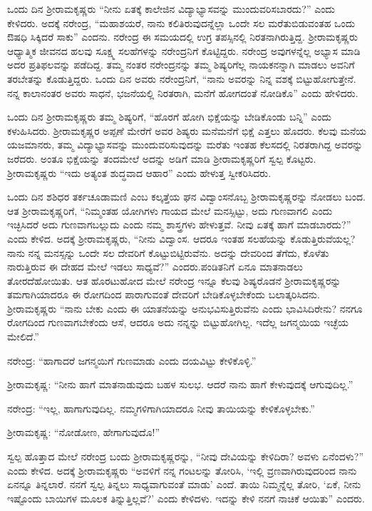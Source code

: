 ಒಂದು ದಿನ ಶ‍್ರೀರಾಮಕೃಷ್ಣರು “ನೀನು ಏತಕ್ಕೆ ಕಾಲೇಜಿನ ವಿದ್ಯಾಭ್ಯಾಸವನ್ನು ಮುಂದುವರಿಸಬಾರದು?” ಎಂದು ಕೇಳಿದರು. ಅದಕ್ಕೆ ನರೇಂದ್ರ, “ಮಹಾಶಯರೆ, ನಾನು ಕಲಿತಿರುವುದನ್ನೆಲ್ಲಾ ಒಂದೇ ಸಲ ಮರೆತುಬಿಡುವಂತಹ ಒಂದು ಔಷಧಿ ಸಿಕ್ಕಿದರೆ ಸಾಕು” ಎಂದನು. ನರೇಂದ್ರ ಈ ಸಮಯದಲ್ಲಿ ಉಗ್ರ ತಪಸ್ಸಿನಲ್ಲಿ ನಿರತನಾಗಿರುತ್ತಿದ್ದ. ಶ‍್ರೀರಾಮಕೃಷ್ಣರು ಆಧ್ಯಾತ್ಮಿಕ ಜೀವನದ ಹಲವು ಸೂಕ್ಷ್ಮ ಸಲಹೆಗಳನ್ನು ನರೇಂದ್ರನಿಗೆ ಕೊಟ್ಟಿದ್ದರು. ನರೇಂದ್ರ ಅವುಗಳನ್ನೆಲ್ಲ ಅಭ್ಯಾಸ ಮಾಡಿ ಅದರ ಪ್ರತಿಫಲವನ್ನು ಪಡೆದಿದ್ದ. ತಮ್ಮ ನಂತರ ನರೇಂದ್ರನನ್ನು ತಮ್ಮ ಶಿಷ್ಯರಿಗೆಲ್ಲ ನಾಯಕನನ್ನಾಗಿ ಮಾಡಲು ಅವನಿಗೆ ತರಬೇತನ್ನು ಕೊಡುತ್ತಿದ್ದರು. ಒಂದು ದಿನ ಅವರು ನರೇಂದ್ರನಿಗೆ, “ನಾನು ಅವರನ್ನು ನಿನ್ನ ವಶಕ್ಕೆ ಬಿಟ್ಟುಹೋಗುತ್ತೇನೆ. ನನ್ನ ಕಾಲಾನಂತರ ಅವರು ಸಾಧನೆ, ಭಜನೆಯಲ್ಲಿ ನಿರತರಾಗಿ, ಮನೆಗೆ ಹೋಗದಂತೆ ನೋಡಿಕೊ” ಎಂದು ಹೇಳಿದರು.

ಒಂದು ದಿನ ಶ‍್ರೀರಾಮಕೃಷ್ಣರು ತಮ್ಮ ಶಿಷ್ಯರಿಗೆ, “ಹೊರಗೆ ಹೋಗಿ ಭಿಕ್ಷೆಯನ್ನು ಬೇಡಿಕೊಂಡು ಬನ್ನಿ” ಎಂದು ಕಳುಹಿಸಿದರು. ಶ‍್ರೀರಾಮಕೃಷ್ಣರ ಅಪ್ಪಣೆ ಮೇರೆಗೆ ಅವರ ಶಿಷ್ಯರು ಮನೆಮನೆಗೆ ಭಿಕ್ಷೆ ಎತ್ತಲು ಹೊದರು. ಕೆಲವು ಮನೆಯ ಯಜಮಾನರು, ತಮ್ಮ ವಿದ್ಯಾಭ್ಯಾಸವನ್ನು ಮುಂದುವರಿಸುವುದನ್ನು ಮರೆತು ಇಂತಹ ಕೆಲಸದಲ್ಲಿ ನಿರತರಾಗಿದ್ದ ಅವರನ್ನು ಜರೆದರು. ಅಂತೂ ಭಿಕ್ಷೆಯನ್ನು ತಂದಮೇಲೆ ಅದನ್ನು ಅಡಿಗೆ ಮಾಡಿ ಶ‍್ರೀರಾಮಕೃಷ್ಣರಿಗೆ ಸ್ವಲ್ಪ ಕೊಟ್ಟರು. ಶ‍್ರೀರಾಮಕೃಷ್ಣರು “ಇದು ಅತ್ಯಂತ ಶುದ್ಧವಾದ ಆಹಾರ” ಎಂದು ಹೇಳುತ್ತ ಸ್ವೀಕರಿಸಿದರು.

ಒಂದು ದಿನ ಶಶಿಧರ ತರ್ಕಚೂಡಾಮಣಿ ಎಂಬ ಕಲ್ಕತ್ತೆಯ ಘನ ವಿದ್ವಾಂಸನೊಬ್ಬ ಶ‍್ರೀರಾಮಕೃಷ್ಣರನ್ನು ನೋಡಲು ಬಂದ. ಆತ ಶ‍್ರೀರಾಮಕೃಷ್ಣರಿಗೆ, “ನಿಮ್ಮಂತಹ ಯೋಗಿಗಳು ಗಾಯದ ಮೇಲೆ ಮನಸ್ಸಿಟ್ಟು, ಅದು ಗುಣವಾಗಲಿ ಎಂದು ಇಚ್ಛಿಸಿದರೆ ಅದು ಗುಣವಾಗಬಲ್ಲುದು ಎಂದು ನಮ್ಮ ಶಾಸ್ತ್ರಗಳು ಹೇಳುತ್ತವೆ. ನೀವು ಏತಕ್ಕೆ ಹಾಗೆ ಮಾಡಬಾರದು?” ಎಂದು ಕೇಳಿದ. ಅದಕ್ಕೆ ಶ‍್ರೀರಾಮಕೃಷ್ಣರು, “ನೀನು ವಿದ್ವಾಂಸ. ಆದರೂ ಇಂತಹ ಸಲಹೆಯನ್ನು ಕೊಡುತ್ತಿರುವೆಯಲ್ಲ? ನಾನು ನನ್ನ ಮನಸ್ಸನ್ನು ಒಂದೇ ಸಲ ದೇವರಿಗೆ ಕೊಟ್ಟುಬಿಟ್ಟಿರುವೆನು. ಅದನ್ನು ದೇವರಿಂದ ತೆಗೆದು, ಕೊಳೆತು ನಾರುತ್ತಿರುವ ಈ ದೇಹದ ಮೇಲೆ ಇಡಲು ಸಾಧ್ಯವೆ?” ಎಂದರು.\break ಪಂಡಿತನಿಗೆ ಏನೂ ಮಾತನಾಡಲು ತೋರದೆಹೋಯಿತು. ಆತ ಹೊರಟುಹೋದ ಮೇಲೆ ನರೇಂದ್ರ ಇನ್ನೂ ಕೆಲವು ಶಿಷ್ಯರೊಡನೆ ಶ‍್ರೀರಾಮಕೃಷ್ಣರನ್ನು ತಮಗಾಗಿಯಾದರೂ ಈ ರೋಗದಿಂದ ಪಾರಾಗುವಂತೆ ದೇವರಿಗೆ ಬೇಡಿಕೊಳ್ಳಬೇಕೆಂದು ಬಲಾತ್ಕರಿಸಿದನು. ಶ‍್ರೀರಾಮಕೃಷ್ಣರು “ನಾನು ಬೇಕು ಎಂದು ಈ ಯಾತನೆಯನ್ನು ಅನುಭವಿಸುತ್ತಿರುವೆನು ಎಂದು ಭಾವಿಸಿದಿರೇನು? ನನಗೂ ರೋಗದಿಂದ ಗುಣವಾಗಬೇಕೆಂದು ಆಸೆ, ಆದರೂ ಅದು ನನ್ನನ್ನು ಬಿಟ್ಟುಹೋಗಿಲ್ಲ. ಇದೆಲ್ಲ ಜಗನ್ಮಯಿಯ ಇಚ್ಛೆಯ ಮೇಲಿದೆ.”

ನರೇಂದ್ರ: “ಹಾಗಾದರೆ ಜಗನ್ಮಯಿಗೆ ಗುಣಮಾಡು ಎಂದು ದಯವಿಟ್ಟು ಕೇಳಿಕೊಳ್ಳಿ.”

ಶ‍್ರೀರಾಮಕೃಷ್ಣ: “ನೀನು ಹಾಗೆ ಮಾತನಾಡುವುದು ಬಹಳ ಸುಲಭ. ಆದರೆ ನಾನು ಹಾಗೆ ಕೇಳುವುದಕ್ಕೆ ಆಗುವುದಿಲ್ಲ.”

ನರೇಂದ್ರ: “ಇಲ್ಲ, ಹಾಗಾಗುವುದಿಲ್ಲ. ನಮ್ಮಗಳಿಗಾಗಿಯಾದರೂ ನೀವು ತಾಯಿಯನ್ನು ಕೇಳಿಕೊಳ್ಳಬೇಕು.”

ಶ‍್ರೀರಾಮಕೃಷ್ಣ: “ನೋಡೋಣ, ಹೇಗಾಗುವುದೊ!”

ಸ್ವಲ್ಪ ಹೊತ್ತಾದ ಮೇಲೆ ನರೇಂದ್ರ ಬಂದು ಶ‍್ರೀರಾಮಕೃಷ್ಣರನ್ನು, “ನೀವು ದೇವಿಯನ್ನು ಕೇಳಿದಿರಾ? ಅವಳು ಏನೆಂದಳು?” ಎಂದು ಕೇಳಿದ. ಅದಕ್ಕೆ ಶ‍್ರೀರಾಮಕೃಷ್ಣರು “ಅವಳಿಗೆ ನನ್ನ ಗಂಟಲನ್ನು ತೋರಿಸಿ, ‘ಇಲ್ಲಿ ವ್ರಣವಾಗಿರುವುದರಿಂದ ನಾನು ಏನನ್ನೂ ತಿನ್ನಲಾರೆ. ನನಗೆ ಸ್ವಲ್ಪ ತಿನ್ನಲು ಸಾಧ್ಯವಾಗುವಂತೆ ಮಾಡು’ ಎಂದೆ. ತಾಯಿ ನಿಮ್ಮನ್ನೆಲ್ಲ ತೋರಿ, ‘ಏಕೆ, ನೀನು ಇಷ್ಟೊಂದು ಬಾಯಿಗಳ ಮೂಲಕ ತಿನ್ನುತ್ತಿಲ್ಲವೆ?’ ಎಂದು ಕೇಳಿದಳು. ಇದನ್ನು ಕೇಳಿ ನನಗೆ ನಾಚಿಕೆ ಆಯಿತು” ಎಂದರು.


